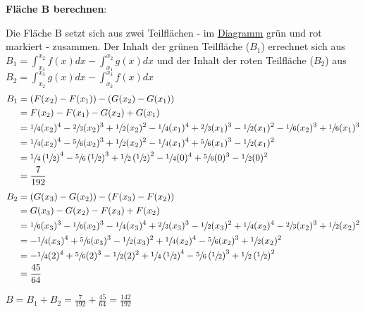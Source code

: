 \documentclass{article}
\begin{document}
\newpage
\textbf{Fläche B berechnen}:

Die Fläche B setzt sich aus zwei Teilflächen - im \hyperref[dia:4]{Diagramm}
grün und rot markiert - zusammen.
Der Inhalt der grünen Teilfläche ($B_1$) errechnet sich aus
$B_1 = \int_{x_1}^{x_2} f(x) dx - \int_{x_1}^{x_2} g(x) dx$ und der Inhalt der roten
Teilfläche ($B_2$) aus
$B_2 = \int_{x_2}^{x_3} g(x) dx - \int_{x_2}^{x_3} f(x) dx$
\begin{align*}
  B_1 &= \left( F(x_2) - F(x_1) \right) - \left( G(x_2) - G(x_1) \right) \\
      &= F(x_2) - F(x_1) - G(x_2) + G(x_1) \\
      &= \sfrac{1}{4}(x_2)^4 - \sfrac{2}{3}(x_2)^3 + \sfrac{1}{2}(x_2)^2 - \sfrac{1}{4}(x_1)^4 + \sfrac{2}{3}(x_1)^3 - \sfrac{1}{2}(x_1)^2 -
        \sfrac{1}{6}(x_2)^3 + \sfrac{1}{6}(x_1)^3 \\
      &= \sfrac{1}{4}(x_2)^4 - \sfrac{5}{6}(x_2)^3 + \sfrac{1}{2}(x_2)^2 - \sfrac{1}{4}(x_1)^4 + \sfrac{5}{6}(x_1)^3 - \sfrac{1}{2}(x_1)^2 \\
      &= \sfrac{1}{4}\left(\sfrac{1}{2}\right)^4 - \sfrac{5}{6}\left(\sfrac{1}{2}\right)^3 + \sfrac{1}{2}\left(\sfrac{1}{2}\right)^2 -
        \sfrac{1}{4}(0)^4 + \sfrac{5}{6}(0)^3 - \sfrac{1}{2}(0)^2 \\
      &= \frac{7}{192}
\end{align*}
\begin{align*}
  B_2 &=\left( G(x_3) - G(x_2) \right) - \left( F(x_3) - F(x_2) \right) \\
      &= G(x_3) - G(x_2) - F(x_3) + F(x_2) \\
      &= \sfrac{1}{6}(x_3)^3 - \sfrac{1}{6}(x_2)^3 - \sfrac{1}{4}(x_3)^4 + \sfrac{2}{3}(x_3)^3 - \sfrac{1}{2}(x_3)^2 +
        \sfrac{1}{4}(x_2)^4 - \sfrac{2}{3}(x_2)^3 + \sfrac{1}{2}(x_2)^2 \\
      &= - \sfrac{1}{4}(x_3)^4 + \sfrac{5}{6}(x_3)^3 - \sfrac{1}{2}(x_3)^2 +
        \sfrac{1}{4}(x_2)^4 - \sfrac{5}{6}(x_2)^3 + \sfrac{1}{2}(x_2)^2 \\
      &= - \sfrac{1}{4}(2)^4 + \sfrac{5}{6}(2)^3 - \sfrac{1}{2}(2)^2 + \sfrac{1}{4}\left(\sfrac{1}{2}\right)^4 -
        \sfrac{5}{6}\left(\sfrac{1}{2}\right)^3 + \sfrac{1}{2}\left(\sfrac{1}{2}\right)^2 \\
      &= \frac{45}{64}
\end{align*}

$B = B_1 + B_2 = \frac{7}{192} + \frac{45}{64} = \frac{142}{192}$
\end{document}
